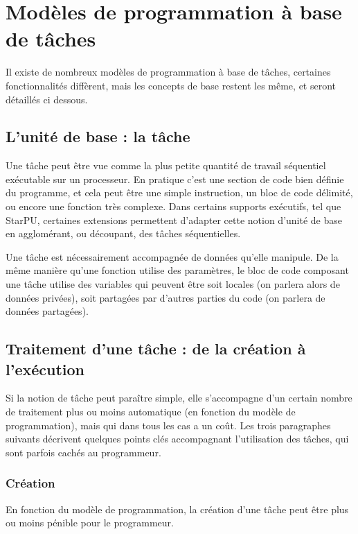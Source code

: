 \section{Modèles de programmation à base de tâches}\label{sec:context:others}

Il existe de nombreux modèles de programmation à base de tâches, certaines fonctionnalités diffèrent, mais les concepts de base restent les même, et seront détaillés ci dessous.

\subsection{L'unité de base : la tâche}

Une tâche peut être vue comme la plus petite quantité de travail séquentiel exécutable sur un processeur.
En pratique c'est une section de code bien définie du programme, et cela peut être une simple instruction, un bloc de code délimité, ou encore une fonction très complexe.
Dans certains supports exécutifs, tel que StarPU, certaines extensions permettent d'adapter cette notion d'unité de base en agglomérant, ou découpant, des tâches séquentielles.

Une tâche est nécessairement accompagnée de données qu'elle manipule. De la même manière qu'une fonction utilise des paramètres, le bloc de code composant une tâche utilise des variables qui peuvent être soit locales (on parlera alors de données privées), soit partagées par d'autres parties du code (on parlera de données partagées).


\subsection{Traitement d'une tâche : de la création à l'exécution}\label{sec:context:others:costs}

Si la notion de tâche peut paraître simple, elle s'accompagne d'un certain nombre de traitement plus ou moins automatique (en fonction du modèle de programmation), mais qui dans tous les cas a un coût.
Les trois paragraphes suivants décrivent quelques points clés accompagnant l'utilisation des tâches, qui sont parfois cachés au programmeur.

\subsubsection{Création}

En fonction du modèle de programmation, la création d'une tâche peut être plus ou moins pénible pour le programmeur.

